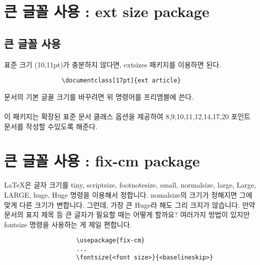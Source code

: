 			
			
			
		
				
	\clearpage
	\section{큰 글꼴 사용 : ext size package }
	\null
	
		\subsection*{큰 글꼴 사용}
	
			표준 크기 (10,11pt)가 충분하지 않다면, extsizes 패키지를 이용하면 된다.\\
			
			\begin{boxedminipage}[c]{1.0\linewidth}
			\begin{verbatim}
				\documentclass[17pt]{ext article}
			\end{verbatim}
			\end{boxedminipage}
			
			문서의 기본 글꼴 크기를 바꾸려면 위 명령어를 프리엠블에 쓴다. 
			\\\\
			이 패키지는 확장된 표준 문서 클래스 옵션을 제공하여 8,9,10,11,12,14,17,20 포인트 문서를 
			작성할 수있도록 해준다.
		
	\clearpage
	\section{큰 글꼴 사용 : fix-cm package }
	\null
	
			LaTeX은 글자 크기를 tiny, scriptsize, footnotesize, small, normalsize, 
			large, Large, LARGE, huge, Huge 명령을 이용해서 정합니다.
			nomalsize의 크기가 정해지면 그에 맞게 다른 크기가 변합니다.
			그런데, 가장 큰 Huge라 해도 그리 크지가 않습니다. 
			만약 문서의 표지 제목 등 큰 글자가 필요할 때는 어떻게 할까요? 
			여러가지 방법이 있지만 fontsize 명령을 사용하는 게 제일 편합니다.\\
			
			\singlespace
			\begin{boxedminipage}[c]{1.0\linewidth}
				\begin{verbatim}
					\usepackage{fix-cm}
					...
					\fontsize{<font size>}{<baselineskip>}
				\end{verbatim}
			\end{boxedminipage}\\

